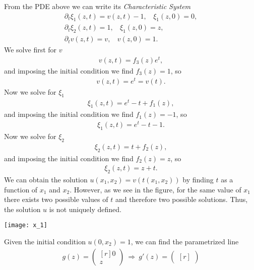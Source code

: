 \begin{questions}

\begin{solution}
From the PDE above we can write its \textit{Characteristic System}
\begin{align*}
\partial_t\xi_1(z,t)=v(z,t)-1,~~~~\xi_1(z,0)=0,\\
\partial_t\xi_2(z,t)=1,~~~~\xi_1(z,0)=z,\\
\partial_tv(z,t)=v,~~~~v(z,0)=1.
\end{align*}
We solve first for $v$
\begin{align*}
v(z,t)=f_3(z)e^t,
\end{align*}
and imposing the initial condition we find $f_3(z)=1$, so
\begin{align*}
v(z,t)=e^t=v(t).
\end{align*}
Now we solve for $\xi_1$
\begin{align*}
\xi_1(z,t)=e^t-t+f_1(z),
\end{align*}
and imposing the initial condition we find $f_1(z)=-1$, so
\begin{align*}
\xi_1(z,t)=e^t-t-1.
\end{align*}
Now we solve for $\xi_2$
\begin{align*}
\xi_2(z,t)=t+f_2(z),
\end{align*}
and imposing the initial condition we find $f_2(z)=z$, so
\begin{align*}
\xi_2(z,t)=z+t.
\end{align*}
We can obtain the solution $u(x_1,x_2)=v(t(x_1,x_2))$ by finding $t$ as a function of $x_1$ and $x_2$. However, as we see in the figure, for the same value of $x_1$ there exists two possible values of $t$ and therefore two possible solutions. Thus, the solution $u$ is not uniquely defined.
\begin{center}
\texttt{[image: x\_1]}
\end{center}
Given the initial condition $u(0,x_2)=1$, we can find the parametrized line 
\begin{align*}
g(z)=\begin{pmatrix*}[r]
0\\
z
\end{pmatrix*}~\Rightarrow~g'(z)=\begin{pmatrix*}[r]

\end{pmatrix*}
\end{align*}
\end{solution}
\end{questions}
